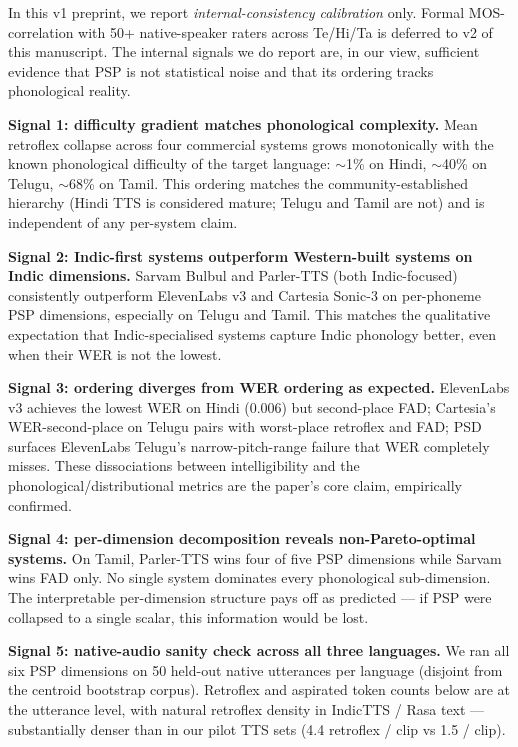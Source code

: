 \documentclass[conference,a4paper]{IEEEtran}
\newcommand{\psp}{\textsc{PSP}}
\begin{document}
In this v1 preprint, we report \emph{internal-consistency calibration} only.
Formal MOS-correlation with 50+ native-speaker raters across Te/Hi/Ta is deferred to v2 of this manuscript. The internal signals we do report are, in our view, sufficient evidence that \psp{} is not statistical noise and that its ordering tracks phonological reality.

\textbf{Signal 1: difficulty gradient matches phonological complexity.} Mean retroflex collapse across four commercial systems grows monotonically with the known phonological difficulty of the target language: $\sim$1\% on Hindi, $\sim$40\% on Telugu, $\sim$68\% on Tamil. This ordering matches the community-established hierarchy (Hindi TTS is considered mature; Telugu and Tamil are not) and is independent of any per-system claim.

\textbf{Signal 2: Indic-first systems outperform Western-built systems on Indic dimensions.} Sarvam Bulbul and Parler-TTS (both Indic-focused) consistently outperform ElevenLabs v3 and Cartesia Sonic-3 on per-phoneme PSP dimensions, especially on Telugu and Tamil. This matches the qualitative expectation that Indic-specialised systems capture Indic phonology better, even when their WER is not the lowest.

\textbf{Signal 3: ordering diverges from WER ordering as expected.} ElevenLabs v3 achieves the lowest WER on Hindi (0.006) but second-place FAD; Cartesia's WER-second-place on Telugu pairs with worst-place retroflex and FAD; PSD surfaces ElevenLabs Telugu's narrow-pitch-range failure that WER completely misses. These dissociations between intelligibility and the phonological/distributional metrics are the paper's core claim, empirically confirmed.

\textbf{Signal 4: per-dimension decomposition reveals non-Pareto-optimal systems.} On Tamil, Parler-TTS wins four of five PSP dimensions while Sarvam wins FAD only. No single system dominates every phonological sub-dimension. The interpretable per-dimension structure pays off as predicted --- if PSP were collapsed to a single scalar, this information would be lost.

\textbf{Signal 5: native-audio sanity check across all three languages.} We ran all six PSP dimensions on 50 held-out native utterances per language (disjoint from the centroid bootstrap corpus). Retroflex and aspirated token counts below are at the utterance level, with natural retroflex density in IndicTTS / Rasa text --- substantially denser than in our pilot TTS sets (4.4 retroflex / clip vs 1.5 / clip).
\end{document}
